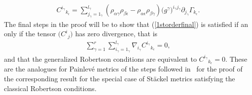 \documentclass[pdftex]{sigma}
\numberwithin{equation}{section}
\newcommand{\igamma}{i_{\gamma}}
\newcommand{\jgamma}{j_{\gamma}}
\newcommand{\lgamma}{l_{\gamma}}
\newcommand{\kepsilon}{k_{\epsilon}}
\begin{document}
\begin{gather}\label{defC}
{C^{\igamma}}_{\kepsilon}=\sum_{\jgamma = 1_{\gamma}}^{\lgamma}(\rho_{\alpha \gamma}\rho_{\beta \epsilon}-\rho_{\alpha \epsilon}\rho_{\beta \gamma})\big(g^{\gamma}\big)^{\igamma \jgamma}\partial_{\jgamma}
\Gamma_{\kepsilon}.
\end{gather}
The final steps in the proof will be to show that (\ref{1storderfinal}) is satisfied if an only if the tensor $\big({C^{i}}_{j}\big)$ has zero divergence, that is
\begin{gather*}%
\sum_{\gamma =1}^{r}\sum_{\igamma = 1_{\gamma}}^{\lgamma}\nabla_{\igamma}{C^{\igamma}}_{\kepsilon}=0,
\end{gather*}
and that the generalized Robertson conditions are equivalent to ${C^{\igamma}}_{\kepsilon}=0$. These are the analogues for Painlev\'e metrics of the steps followed in~\cite{BCR2-2002} for the proof of the corresponding result for the special case of St\"ackel metrics satisfying the classical Robertson conditions.
\end{document}
